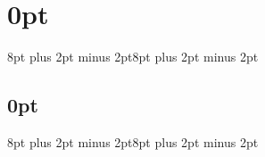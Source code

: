 \def\marginsize{15mm}
\geometry{
	left=\marginsize,
	right=\marginsize,
	top=\marginsize,
	bottom=\marginsize
}
\usepackage{paratype}
\def\typeface{\sfdefault}
\headerfont{\fontfamily{\typeface}\selectfont}
\titlefont{\fontfamily{\typeface}\selectfont\Huge}
\sectionfont{\fontfamily{\typeface}\selectfont\large}
\subsectionfont{\fontfamily{\typeface}\selectfont}
\topiclabelfont{\it\fontfamily{\typeface}\selectfont}
\topictitlefont{\fontfamily{\typeface}\selectfont}
\renewcommand{\topicmargin}{8em}
\setlength{\parindent}{0cm}
\titlespacing\section{0pt}{8pt plus 2pt minus 2pt}{8pt plus 2pt minus 2pt}
\titlespacing\subsection{0pt}{8pt plus 2pt minus 2pt}{8pt plus 2pt minus 2pt}
\usepackage{xcolor}
[\titlerule]
[\titlerule]
\titlespacing{\section}{0em}{0.5em}{0.25em}
\newcommand{\colorsection}[1]{\colorbox{lightgray}{\parbox{\dimexpr\textwidth-2\fboxsep}{\thesection\ #1}}}
\newcommand{\colorsectionnonumber}[1]{\colorbox{lightgray}{\parbox{\dimexpr\textwidth-2\fboxsep}{#1}}}


